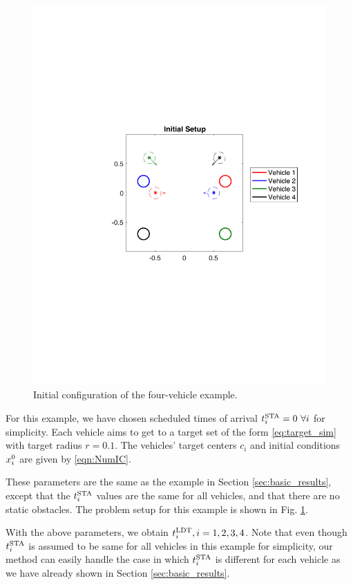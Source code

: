 \begin{figure}[H]
  \centering
  \includegraphics[width=\columnwidth]{"fig/init_setup"}
  \caption{Initial configuration of the four-vehicle example.}
  \label{fig:init_setup_dstb}
\end{figure}

For this example, we have chosen scheduled times of arrival $t^\text{STA}_i = 0~\forall i$ for simplicity. Each vehicle aims to get to a target set of the form \eqref{eq:target_sim} with target radius $r=0.1$. The vehicles' target centers $c_i$ and initial conditions $x_i^0$ are given by \eqref{eqn:NumIC}.

These parameters are the same as the example in Section \ref{sec:basic_results}, except that the $t^\text{STA}_i$ values are the same for all vehicles, and that there are no static obstacles. The problem setup for this example is shown in Fig. \ref{fig:init_setup_dstb}.

With the above parameters, we obtain $t^\text{LDT}_i, i=1,2,3,4$. Note that even though $t^\text{STA}_i$ is assumed to be same for all vehicles in this example for simplicity, our method can easily handle the case in which $t^\text{STA}_i$ is different for each vehicle as we have already shown in Section \ref{sec:basic_results}.


